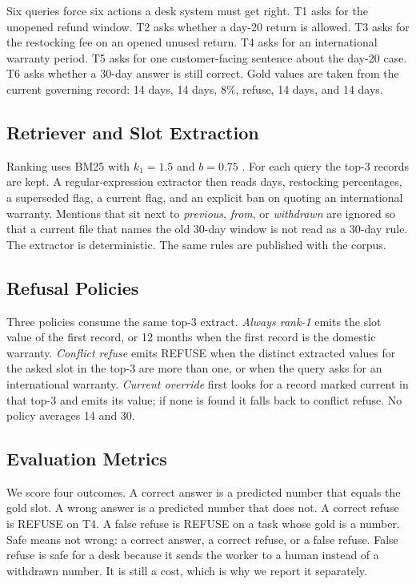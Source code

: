 \documentclass{icaiit2027}
\begin{document}
Six queries force six actions a desk system must get right. T1 asks for the unopened refund window. T2 asks whether a day-20 return is allowed. T3 asks for the restocking fee on an opened unused return. T4 asks for an international warranty period. T5 asks for one customer-facing sentence about the day-20 case. T6 asks whether a 30-day answer is still correct. Gold values are taken from the current governing record: 14 days, 14 days, 8\%, refuse, 14 days, and 14 days.

\subsection{Retriever and Slot Extraction}

Ranking uses BM25 with $k_1 = 1.5$ and $b = 0.75$ \cite{robertson2009}. For each query the top-3 records are kept. A regular-expression extractor then reads days, restocking percentages, a superseded flag, a current flag, and an explicit ban on quoting an international warranty. Mentions that sit next to \emph{previous}, \emph{from}, or \emph{withdrawn} are ignored so that a current file that names the old 30-day window is not read as a 30-day rule. The extractor is deterministic. The same rules are published with the corpus.

\subsection{Refusal Policies}

Three policies consume the same top-3 extract. \emph{Always rank-1} emits the slot value of the first record, or 12 months when the first record is the domestic warranty. \emph{Conflict refuse} emits REFUSE when the distinct extracted values for the asked slot in the top-3 are more than one, or when the query asks for an international warranty. \emph{Current override} first looks for a record marked current in that top-3 and emits its value; if none is found it falls back to conflict refuse. No policy averages 14 and 30.

\subsection{Evaluation Metrics}

We score four outcomes. A correct answer is a predicted number that equals the gold slot. A wrong answer is a predicted number that does not. A correct refuse is REFUSE on T4. A false refuse is REFUSE on a task whose gold is a number. Safe means not wrong: a correct answer, a correct refuse, or a false refuse. False refuse is safe for a desk because it sends the worker to a human instead of a withdrawn number. It is still a cost, which is why we report it separately.
\end{document}
